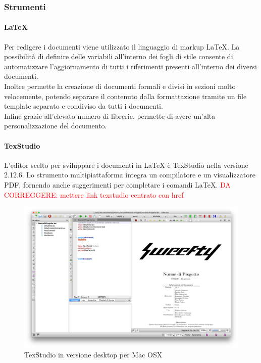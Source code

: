 	\subsubsection{Strumenti}
		\paragraph{\LaTeX}\Spazio
		Per redigere i documenti viene utilizzato il linguaggio di markup \LaTeX. La possibilità di definire delle variabili all'interno dei fogli di stile consente di automatizzare l'aggiornamento di tutti i riferimenti presenti all'interno dei diversi documenti.\\
		Inoltre permette la creazione di documenti formali e divisi in sezioni molto velocemente, potendo separare il contenuto dalla formattazione tramite un file template separato e condiviso da tutti i documenti.\\
		Infine grazie all'elevato numero di librerie, permette di avere un'alta personalizzazione del documento.
		\paragraph{TexStudio}\Spazio
		L'editor scelto per sviluppare i documenti in \LaTeX\text{ } è TexStudio nella versione 2.12.6. 
		Lo strumento multipiattaforma integra un compilatore e un visualizzatore PDF, fornendo anche suggerimenti per completare i comandi \LaTeX.
		\newline
		\textcolor{red}{DA CORREGGERE: mettere link texstudio centrato con href}
		\begin{figure}[H]
				\centering
				\includegraphics[width=1\textwidth]{Images/texstudio.png}
				\caption{TexStudio in versione desktop per Mac OSX}
			\end{figure}
			
